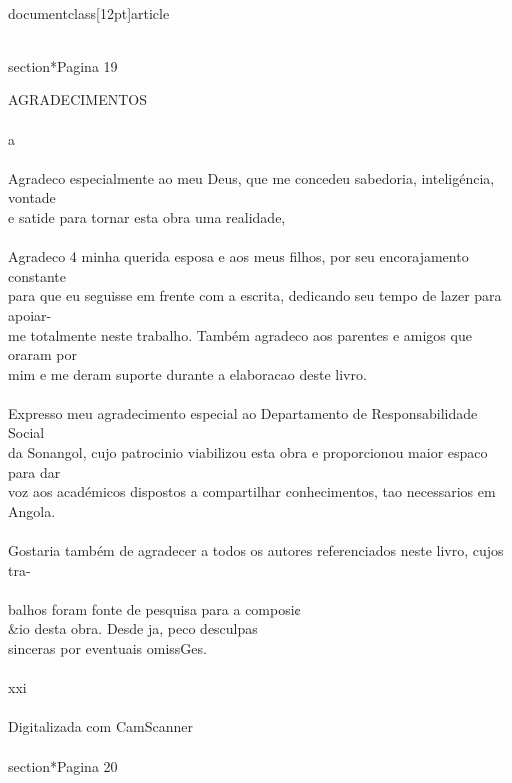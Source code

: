 \\documentclass[12pt]{article}
\begin{document}
{\\section*{Pagina 19}

AGRADECIMENTOS\\
\\
a\\
\\
Agradeco especialmente ao meu Deus, que me concedeu sabedoria, inteligéncia, vontade\\
e satide para tornar esta obra uma realidade,\\
\\
Agradeco 4 minha querida esposa e aos meus filhos, por seu encorajamento constante\\
para que eu seguisse em frente com a escrita, dedicando seu tempo de lazer para apoiar-\\
me totalmente neste trabalho. Também agradeco aos parentes e amigos que oraram por\\
mim e me deram suporte durante a elaboracao deste livro.\\
\\
Expresso meu agradecimento especial ao Departamento de Responsabilidade Social\\
da Sonangol, cujo patrocinio viabilizou esta obra e proporcionou maior espaco para dar\\
voz aos académicos dispostos a compartilhar conhecimentos, tao necessarios em Angola.\\
\\
Gostaria também de agradecer a todos os autores referenciados neste livro, cujos tra-\\
\\
balhos foram fonte de pesquisa para a composi¢\\&io desta obra. Desde ja, peco desculpas\\
sinceras por eventuais omissGes.\\
\\
xxi\\
\\
Digitalizada com CamScanner\\

\\section*{Pagina 20}

}
\end{document}
